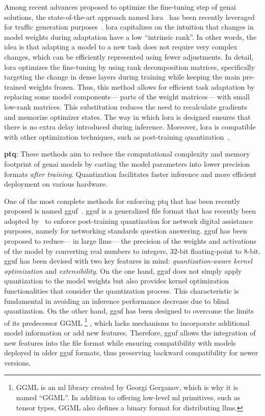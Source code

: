 Among recent advances proposed to optimize the fine-tuning step of \gls{genai} solutions,
the state-of-the-art approach named \gls{lora}~\cite{hu2021lora} has been recently leveraged for traffic generation purposes~\cite{jiang2024netdiffusion}.
\gls{lora} capitalizes on the intuition that changes in model weights during adaptation have a low ``intrinsic rank''.
In other words, the idea is that adapting a model to a new task does not require very complex changes, which can be efficiently represented using fewer adjustments.
In detail, \gls{lora} optimizes the fine-tuning by using rank decomposition matrices, specifically targeting the change in dense layers during training while keeping the main pre-trained weights frozen.
Thus, this method allows for efficient task adaptation by replacing some model components---%
\ie parts of the weight matrices---%
with small low-rank matrices.
This substitution reduces the need to recalculate gradients and memorize optimizer states.
The way in which \gls{lora} is designed ensures that there is no extra delay introduced during inference. Moreover, \gls{lora} is compatible with other optimization techniques, such as post-training quantization~\cite{ding2023parameter}.



\vspace{5pt}
\noindent
\textbf{\gls{ptq}}:
These methods aim to reduce the computational complexity and memory footprint of \gls{genai} models by casting the model parameters into lower precision formats \emph{after training}. Quantization facilitates faster inference and more efficient deployment on various hardware.

One of the most complete methods for enforcing \gls{ptq} that has been recently proposed is
named \gls{gguf}~\cite{gguf-website}.
\gls{gguf} is a generalized file format that has recently been adopted by~\cite{karapantelakis2024using} to enforce post-training quantization for network digital assistance purposes, namely for networking standards question answering.
\gls{gguf} has been proposed to reduce---%
in large \glspl{llm}---%
the precision of the weights and activations of the model by converting real numbers to integers, \eg $32$-bit floating-point to $8$-bit.
\gls{gguf} has been devised with two key features in mind: \emph{quantization-aware kernel optimization} and \emph{extensibility}.
On the one hand,
\gls{gguf} does not simply apply quantization to the model weights but also provides kernel optimization functionalities that consider the quantization process. This characteristic is fundamental in avoiding an inference performance decrease due to blind quantization.
On the other hand, \gls{gguf} has been designed to overcome the limits of its predecessor GGML%
\footnote{GGML is an \gls{ml} library created by Georgi Gerganov, which is why it is named ``GGML''. In addition to offering low-level \gls{ml} primitives, such as tensor types, GGML also defines a binary format for distributing \glspl{llm}.}%
, which lacks mechanisms to incorporate additional model information or add new features.
Therefore, \gls{gguf} allows the integration of new features into the file format while ensuring compatibility with models deployed in older \gls{gguf} formats, thus preserving backward compatibility for newer versions.

